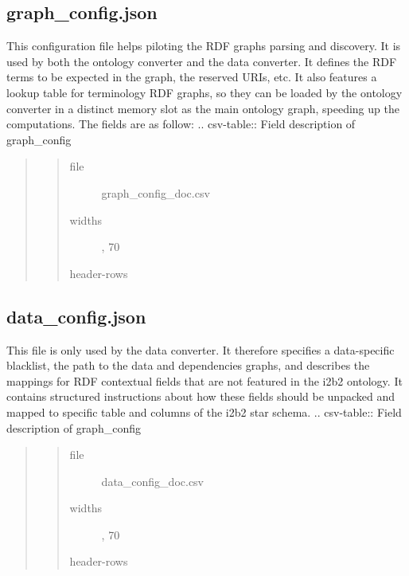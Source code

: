 \documentclass[letterpaper,10pt,english]{sphinxmanual}
\begin{document}
\subsection{graph\_config.json}
\label{\detokenize{configuration:graph-config-json}}
This configuration file helps piloting the RDF graphs parsing and discovery. It is used by both the ontology converter and the data converter. It defines the RDF terms to be expected in the graph, the reserved URIs, etc. It also features a lookup table for terminology RDF graphs, so they can be loaded by the ontology converter in a distinct memory slot as the main ontology graph, speeding up the computations.
The fields are as follow:
.. csv-table:: Field description of graph\_config
\begin{quote}
\begin{quote}\begin{description}
\item[{file}] \leavevmode
graph\_config\_doc.csv

\item[{widths}] , 70

\item[{header-rows}] 

\end{description}\end{quote}
\end{quote}


\subsection{data\_config.json}
\label{\detokenize{configuration:data-config-json}}
This file is only used by the data converter.
It therefore specifies a data-specific blacklist, the path to the data and dependencies graphs, and describes the mappings for RDF contextual fields that are not featured in the i2b2 ontology.
It contains structured instructions about how these fields should be unpacked and mapped to specific table and columns of the i2b2 star schema.
.. csv-table:: Field description of graph\_config
\begin{quote}
\begin{quote}\begin{description}
\item[{file}] \leavevmode
data\_config\_doc.csv

\item[{widths}] , 70

\item[{header-rows}] 

\end{description}\end{quote}
\end{quote}
\end{document}
